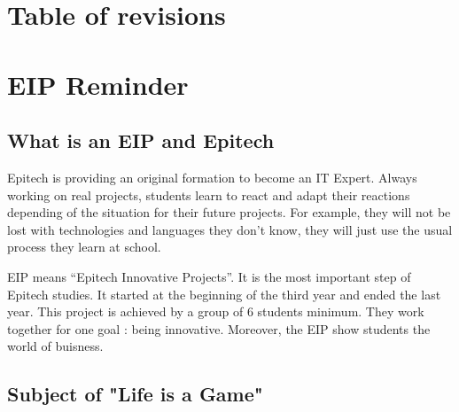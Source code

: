 \documentclass{life-fr}
\begin{document}
\chapter*{Table of revisions}

\listofrevisions

\newpage
\hspace{2cm}
\newpage

\tableofcontents

\newpage
\hspace{2cm}
\newpage

\chapter{EIP Reminder}
\section{What is an EIP and Epitech}

Epitech is providing an original formation to become an IT Expert. Always working on real projects, students learn to react and adapt their reactions depending of the situation for their future projects. For example, they will not be lost with technologies and languages they don’t know, they will just use the usual process they learn at school.

EIP means “Epitech Innovative Projects”. It is the most important step of Epitech studies. It started at the beginning of the third year and ended the last year. This project is achieved by a group of 6 students minimum. They work together for one goal : being innovative.
Moreover, the EIP show students the world of buisness.

\section{Subject of "Life is a Game"}
\end{document}
